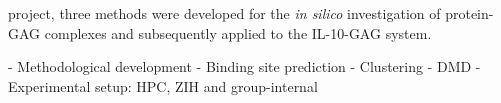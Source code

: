 project, three methods were developed for the \textit{in silico} investigation
of protein-GAG complexes and subsequently applied to the IL-10-GAG system.


    - Methodological development
        - Binding site prediction
        - Clustering
        - DMD
        - Experimental setup: HPC, ZIH and group-internal





